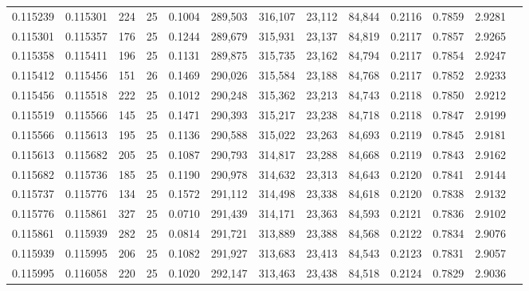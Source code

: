 \begin{tabular}{rrrrrrrrrrrrr}
0.115239 & 0.115301 &   224 &  25 &                                     0.1004 & 289,503 & 316,107 &  23,112 &  84,844 & 0.2116 & 0.7859 & 2.9281 \\
0.115301 & 0.115357 &   176 &  25 &                                     0.1244 & 289,679 & 315,931 &  23,137 &  84,819 & 0.2117 & 0.7857 & 2.9265 \\
0.115358 & 0.115411 &   196 &  25 &                                     0.1131 & 289,875 & 315,735 &  23,162 &  84,794 & 0.2117 & 0.7854 & 2.9247 \\
0.115412 & 0.115456 &   151 &  26 &                                     0.1469 & 290,026 & 315,584 &  23,188 &  84,768 & 0.2117 & 0.7852 & 2.9233 \\
0.115456 & 0.115518 &   222 &  25 &                                     0.1012 & 290,248 & 315,362 &  23,213 &  84,743 & 0.2118 & 0.7850 & 2.9212 \\
0.115519 & 0.115566 &   145 &  25 &                                     0.1471 & 290,393 & 315,217 &  23,238 &  84,718 & 0.2118 & 0.7847 & 2.9199 \\
0.115566 & 0.115613 &   195 &  25 &                                     0.1136 & 290,588 & 315,022 &  23,263 &  84,693 & 0.2119 & 0.7845 & 2.9181 \\
0.115613 & 0.115682 &   205 &  25 &                                     0.1087 & 290,793 & 314,817 &  23,288 &  84,668 & 0.2119 & 0.7843 & 2.9162 \\
0.115682 & 0.115736 &   185 &  25 &                                     0.1190 & 290,978 & 314,632 &  23,313 &  84,643 & 0.2120 & 0.7841 & 2.9144 \\
0.115737 & 0.115776 &   134 &  25 &                                     0.1572 & 291,112 & 314,498 &  23,338 &  84,618 & 0.2120 & 0.7838 & 2.9132 \\
0.115776 & 0.115861 &   327 &  25 &                                     0.0710 & 291,439 & 314,171 &  23,363 &  84,593 & 0.2121 & 0.7836 & 2.9102 \\
0.115861 & 0.115939 &   282 &  25 &                                     0.0814 & 291,721 & 313,889 &  23,388 &  84,568 & 0.2122 & 0.7834 & 2.9076 \\
0.115939 & 0.115995 &   206 &  25 &                                     0.1082 & 291,927 & 313,683 &  23,413 &  84,543 & 0.2123 & 0.7831 & 2.9057 \\
0.115995 & 0.116058 &   220 &  25 &                                     0.1020 & 292,147 & 313,463 &  23,438 &  84,518 & 0.2124 & 0.7829 & 2.9036 \\

\end{tabular}
